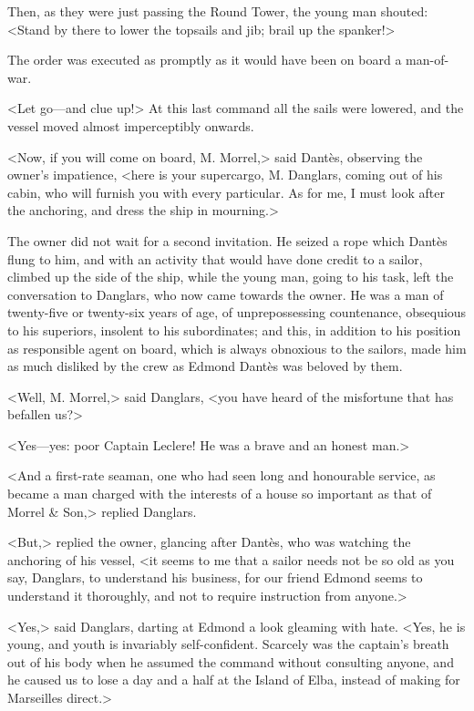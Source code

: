  Then, as they were just passing the Round Tower, the young man shouted: <Stand by there to lower the topsails and jib; brail up the spanker!> 

 The order was executed as promptly as it would have been on board a man-of-war. 

 <Let go—and clue up!> At this last command all the sails were lowered, and the vessel moved almost imperceptibly onwards. 

 <Now, if you will come on board, M. Morrel,> said Dantès, observing the owner's impatience, <here is your supercargo, M. Danglars, coming out of his cabin, who will furnish you with every particular. As for me, I must look after the anchoring, and dress the ship in mourning.> 

 The owner did not wait for a second invitation. He seized a rope which Dantès flung to him, and with an activity that would have done credit to a sailor, climbed up the side of the ship, while the young man, going to his task, left the conversation to Danglars, who now came towards the owner. He was a man of twenty-five or twenty-six years of age, of unprepossessing countenance, obsequious to his superiors, insolent to his subordinates; and this, in addition to his position as responsible agent on board, which is always obnoxious to the sailors, made him as much disliked by the crew as Edmond Dantès was beloved by them. 

 <Well, M. Morrel,> said Danglars, <you have heard of the misfortune that has befallen us?> 

 <Yes—yes: poor Captain Leclere! He was a brave and an honest man.> 

 <And a first-rate seaman, one who had seen long and honourable service, as became a man charged with the interests of a house so important as that of Morrel \& Son,> replied Danglars. 

 <But,> replied the owner, glancing after Dantès, who was watching the anchoring of his vessel, <it seems to me that a sailor needs not be so old as you say, Danglars, to understand his business, for our friend Edmond seems to understand it thoroughly, and not to require instruction from anyone.> 

 <Yes,> said Danglars, darting at Edmond a look gleaming with hate. <Yes, he is young, and youth is invariably self-confident. Scarcely was the captain's breath out of his body when he assumed the command without consulting anyone, and he caused us to lose a day and a half at the Island of Elba, instead of making for Marseilles direct.>  
 
